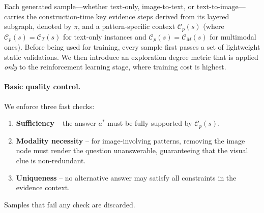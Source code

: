\documentclass[11pt]{article}
\begin{document}
Each generated sample---whether text-only, image-to-text, or text-to-image---carries the construction-time key evidence steps derived from its layered subgraph, denoted by $\pi$, and a pattern-specific context $\mathcal{C}_p(s)$ (where $\mathcal{C}_p(s)=\mathcal{C}_T(s)$ for text-only instances and $\mathcal{C}_p(s)=\mathcal{C}_M(s)$ for multimodal ones). Before being used for training, every sample first passes a set of lightweight static validations. We then introduce an exploration degree metric that is applied \emph{only} to the reinforcement learning stage, where training cost is highest.

\paragraph{Basic quality control.}
We enforce three fast checks:
\begin{enumerate}[leftmargin=*,nosep]
    \item \textbf{Sufficiency} – the answer $a^*$ must be fully supported by $\mathcal{C}_p(s)$.
    \item \textbf{Modality necessity} – for image-involving patterns, removing the image node must render the question unanswerable, guaranteeing that the visual clue is non-redundant.
    \item \textbf{Uniqueness} – no alternative answer may satisfy all constraints in the evidence context.
\end{enumerate}
Samples that fail any check are discarded.
\end{document}
